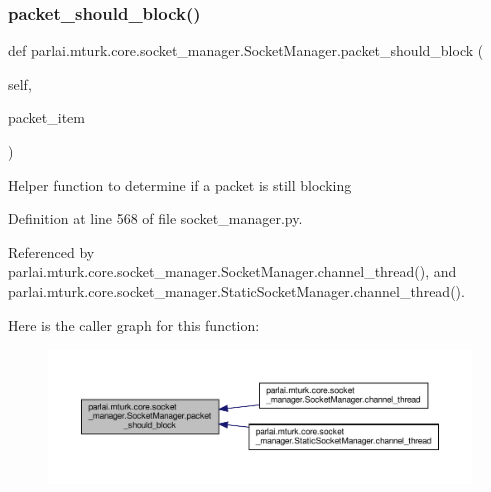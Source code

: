 \subsubsection{\texorpdfstring{packet\+\_\+should\+\_\+block()}{packet\_should\_block()}}
{\footnotesize\ttfamily def parlai.\+mturk.\+core.\+socket\+\_\+manager.\+Socket\+Manager.\+packet\+\_\+should\+\_\+block (\begin{DoxyParamCaption}\item[{}]{self,  }\item[{}]{packet\+\_\+item }\end{DoxyParamCaption})}

\begin{DoxyVerb}Helper function to determine if a packet is still blocking\end{DoxyVerb}
 

Definition at line 568 of file socket\+\_\+manager.\+py.



Referenced by parlai.\+mturk.\+core.\+socket\+\_\+manager.\+Socket\+Manager.\+channel\+\_\+thread(), and parlai.\+mturk.\+core.\+socket\+\_\+manager.\+Static\+Socket\+Manager.\+channel\+\_\+thread().

Here is the caller graph for this function\+:
\nopagebreak
\begin{figure}[H]
\begin{center}
\leavevmode
\includegraphics[width=350pt]{classparlai_1_1mturk_1_1core_1_1socket__manager_1_1SocketManager_a7b41199438da8694cc9c8d9b3e58da85_icgraph}
\end{center}
\end{figure}
\mbox{\label{classparlai_1_1mturk_1_1core_1_1socket__manager_1_1SocketManager_a91c7216d011823f1c6c4963d863638c8}} 
